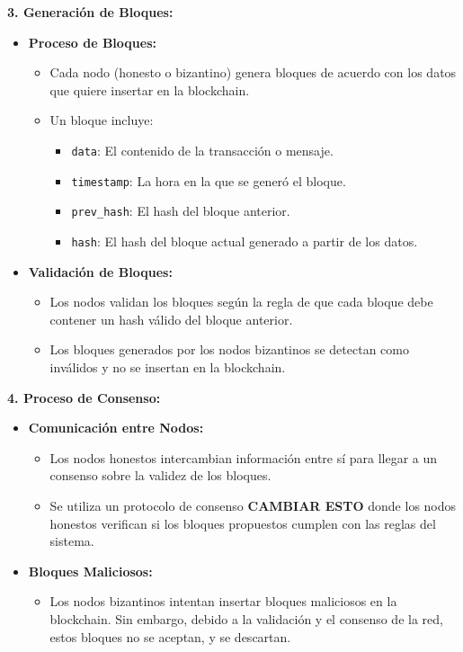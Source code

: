 {{    \vspace{0.5cm}

    \textbf{3. Generación de Bloques:}
    \begin{itemize}
        \item \textbf{Proceso de Bloques:}
        \begin{itemize}
            \item Cada nodo (honesto o bizantino) genera bloques de acuerdo con los datos que quiere insertar en la blockchain.
            \item Un bloque incluye:
            \begin{itemize}
                \item \texttt{data}: El contenido de la transacción o mensaje.
                \item \texttt{timestamp}: La hora en la que se generó el bloque.
                \item \texttt{prev\_hash}: El hash del bloque anterior.
                \item \texttt{hash}: El hash del bloque actual generado a partir de los datos.
            \end{itemize}
        \end{itemize}
        \item \textbf{Validación de Bloques:}
        \begin{itemize}
            \item Los nodos validan los bloques según la regla de que cada bloque debe contener un hash válido del bloque anterior.
            \item Los bloques generados por los nodos bizantinos se detectan como inválidos y no se insertan en la blockchain.
        \end{itemize}
    \end{itemize}

    \vspace{0.5cm}

    \textbf{4. Proceso de Consenso:}
    \begin{itemize}
        \item \textbf{Comunicación entre Nodos:}
        \begin{itemize}
            \item Los nodos honestos intercambian información entre sí para llegar a un consenso sobre la validez de los bloques.
            \item Se utiliza un protocolo de consenso \textbf{CAMBIAR ESTO} donde los nodos honestos verifican si los bloques propuestos cumplen con las reglas del sistema.
        \end{itemize}
        \item \textbf{Bloques Maliciosos:}
        \begin{itemize}
            \item Los nodos bizantinos intentan insertar bloques maliciosos en la blockchain. Sin embargo, debido a la validación y el consenso de la red, estos bloques no se aceptan, y se descartan.
        \end{itemize}
    \end{itemize}

}}
